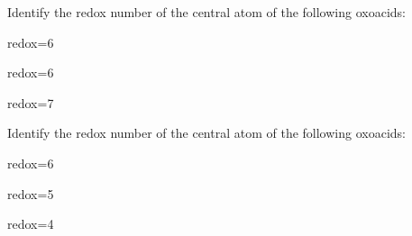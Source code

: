 \documentclass[main.tex]{subfiles}
\begin{document}
\begin{multicols*}{2}
\begin{question}[ID=\the\value{numA}]
Identify the redox number of the central atom of the following oxoacids:
\begin{inparaenum}[(a)]
\item	{}   	%
\item	{}	%
\item	{}	%
\end{inparaenum}
\end{question}
\begin{solution}
\begin{inparaenum}[(a)]
\item	{}   	redox=6
\item	{}	redox=6
\item	{}	redox=7
\end{inparaenum}\hspace{0.1cm}\end{solution}
\begin{question}[ID=\the\value{numA}]
Identify the redox number of the central atom of the following oxoacids:
\begin{inparaenum}[(a)]
\item	{} 	%
\item	{} 	%
\item	{}	%
\end{inparaenum}
\end{question}
\begin{solution}
\begin{inparaenum}[(a)]
\item	{} 	redox=6
\item	{} 	redox=5
\item	{}	redox=4 
\end{inparaenum}\hspace{0.1cm}\end{solution}






\end{multicols*}
\end{document}
